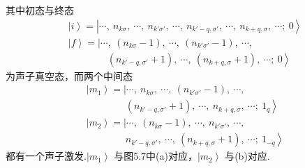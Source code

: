 其中初态与终态
\begin{equation*}
\begin{aligned}
  &\left|i\right\rangle=\left|\cdots,\ n_{k\sigma},\ \cdots,\ n_{k'\sigma'},\ \cdots,\ n_{k'-q,\sigma'},\ \cdots,\ n_{k+q,\sigma},\ \cdots;\ 0\right\rangle\\
  &\left|f\right\rangle=\left|\cdots,\ \left(n_{k\sigma}-1\right),\ \cdots,\ \left(n_{k'\sigma'}-1\right),\ \cdots,\right.\\
  &\qquad\qquad\left.\left(n_{k'-q,\sigma'}+1\right),\ \cdots,\ \left(n_{k+q,\sigma}+1\right),\ \cdots;\ 0\right\rangle
\end{aligned}
\end{equation*}
为声子真空态，而两个中间态
\begin{equation*}
\begin{aligned}
  &\left|m_1\right\rangle=\left|\cdots,\ n_{k\sigma},\ \cdots,\ \left(n_{k'\sigma'}-1\right),\ \cdots,\right.\\
  &\qquad\qquad\left.\left(n_{k'-q,\sigma'}+1\right),\ \cdots,\ n_{k+q,\sigma},\ \cdots;\ 1_q\right\rangle\\
  &\left|m_2\right\rangle=\left|\cdots,\ \left(n_{k\sigma}-1\right),\ \cdots,\ n_{k'\sigma'},\ \cdots,\right.\\
  &\qquad\qquad\left.n_{k'-q,\sigma'},\ \cdots,\ \left(n_{k+q,\sigma}+1\right),\ \cdots;\ 1_{-q}\right\rangle
\end{aligned}
\end{equation*}
都有一个声子激发.$\left|m_1\right\rangle$ 与图5.7中(a)对应，$\left|m_2\right\rangle$ 与(b)对应.

